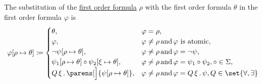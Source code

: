 \begin{definition}
\begin{defenum}
    The substitution of the \hyperref[def:first_order_syntax/formula]{first order formula} \( \rho \) with the first order formula \( \theta \) in the first order formula \( \varphi \) is
    \begin{equation}\label{eq:def:first_order_substitution/formula_in_formula}
      \varphi[\rho \mapsto \theta] \coloneqq \begin{cases}
        \theta,                                                       &\varphi = \rho, \\
        \varphi,                                                      &\varphi \neq \rho \T{and} \varphi \text{ is atomic}, \\
        \neg \psi[\rho \mapsto \theta],                               &\varphi \neq \rho \T{and} \varphi = \neg \psi, \\
        \psi_1[\rho \mapsto \theta] \circ \psi_2[\xi \mapsto \theta], &\varphi \neq \rho \T{and} \varphi = \psi_1 \circ \psi_2, \circ \in \Sigma, \\
        \quantifier{Q}{\xi} \parens[\Big]{\psi[\rho \mapsto \theta]},     &\varphi \neq \rho \T{and} \varphi = \quantifier{Q}{\xi} \psi, Q \in \set{ \forall, \exists }
      \end{cases}
    \end{equation}
  \end{defenum}
\end{definition}

